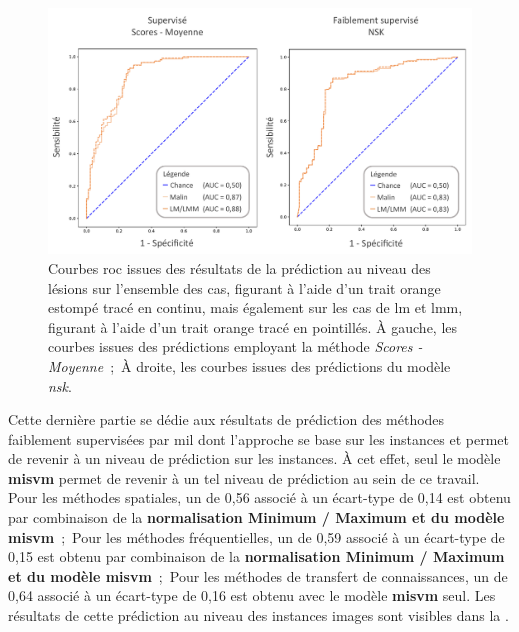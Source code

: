 \begin{figure}[H]
    \centering
    \includegraphics[width=\linewidth]{contents/chapter_7/resources/results_lesion_roc_lesions.pdf}
    \caption{Courbes \gls{roc} issues des résultats de la prédiction au niveau des lésions sur l'ensemble des cas, figurant à l'aide d'un trait orange estompé tracé en continu, mais également sur les cas de \gls{lm} et \gls{lmm}, figurant à l'aide d'un trait orange tracé en pointillés. À gauche, les courbes issues des prédictions employant la méthode \textit{Scores - Moyenne}~;~À droite, les courbes issues des prédictions du modèle \textit{\gls{nsk}}.}
    \label{fig:results_lesion_roc_lesions}
\end{figure}\par

Cette dernière partie se dédie aux résultats de prédiction des méthodes faiblement supervisées par \gls{mil} dont l'approche se base sur les instances et permet de revenir à un niveau de prédiction sur les instances. À cet effet, seul le modèle \textbf{\gls{misvm}} permet de revenir à un tel niveau de prédiction au sein de ce travail. Pour les méthodes spatiales, un \fscore{} de 0,56 associé à un écart-type de 0,14 est obtenu par combinaison de la \textbf{normalisation Minimum / Maximum et du modèle \gls{misvm}}~;~Pour les méthodes fréquentielles, un \fscore{} de 0,59 associé à un écart-type de 0,15 est obtenu par combinaison de la \textbf{normalisation Minimum / Maximum et du modèle \gls{misvm}}~;~Pour les méthodes de transfert de connaissances, un \fscore{} de 0,64 associé à un écart-type de 0,16 est obtenu avec le modèle \textbf{\gls{misvm}} seul. Les résultats de cette prédiction au niveau des instances images sont visibles dans la .\par


